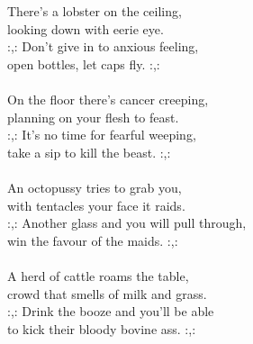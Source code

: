 
            There’s a lobster on the ceiling, \\
            looking down with eerie eye. \\
            :,: Don’t give in to anxious feeling, \\
            open bottles, let caps fly. :,: \\
\hspace{10mm} \\
            On the floor there’s cancer creeping, \\
            planning on your flesh to feast. \\
            :,: It’s no time for fearful weeping, \\
            take a sip to kill the beast. :,: \\
\hspace{10mm} \\
            An octopussy tries to grab you, \\
            with tentacles your face it raids. \\
            :,: Another glass and you will pull through, \\
            win the favour of the maids. :,: \\
\hspace{10mm} \\
            A herd of cattle roams the table, \\
            crowd that smells of milk and grass. \\
            :,: Drink the booze and you’ll be able \\
            to kick their bloody bovine ass. :,: \\
